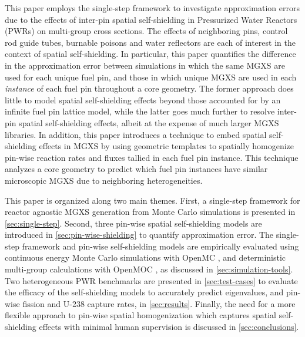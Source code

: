 This paper employs the single-step framework to investigate approximation errors due to the effects of inter-pin spatial self-shielding in Pressurized Water Reactors (PWRs) on multi-group cross sections. The effects of neighboring pins, control rod guide tubes, burnable poisons and water reflectors are each of interest in the context of spatial self-shielding. In particular, this paper quantifies the difference in the approximation error between simulations in which the same MGXS are used for each unique fuel pin, and those in which unique MGXS are used in each \textit{instance} of each fuel pin throughout a core geometry. The former approach does little to model spatial self-shielding effects beyond those accounted for by an infinite fuel pin lattice model, while the latter goes much further to resolve inter-pin spatial self-shielding effects, albeit at the expense of much larger MGXS libraries. In addition, this paper introduces a technique to embed spatial self-shielding effects in MGXS by using geometric templates to spatially homogenize pin-wise reaction rates and fluxes tallied in each fuel pin instance. This technique analyzes a core geometry to predict which fuel pin instances have similar microscopic MGXS due to neighboring heterogeneities.

This paper is organized along two main themes. First, a single-step framework for reactor agnostic MGXS generation from Monte Carlo simulations is presented in \autoref{sec:single-step}. Second, three pin-wise spatial self-shielding models are introduced in \autoref{sec:pin-wise-shielding} to quantify approximation error. The single-step framework and pin-wise self-shielding models are empirically evaluated using continuous energy Monte Carlo simulations with OpenMC \citep{romano2013openmc}, and deterministic multi-group calculations with OpenMOC \citep{boyd2014openmoc}, as discussed in \autoref{sec:simulation-tools}. Two heterogeneous PWR benchmarks are presented in \autoref{sec:test-cases} to evaluate the efficacy of the self-shielding models to accurately predict eigenvalues, and pin-wise fission and U-238 capture rates, in \autoref{sec:results}. Finally, the need for a more flexible approach to pin-wise spatial homogenization which captures spatial self-shielding effects with minimal human supervision is discussed in \autoref{sec:conclusions}.

